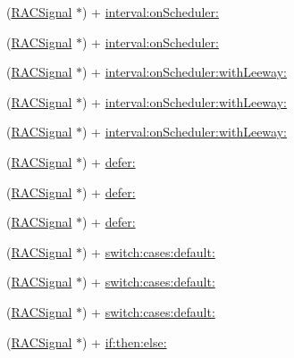 \begin{DoxyCompactItemize}
(\mbox{\hyperlink{interface_r_a_c_signal}{R\+A\+C\+Signal}} $\ast$) + \mbox{\hyperlink{interface_r_a_c_signal_a65442f423ebf08b9217f7bb206780a45}{interval\+:on\+Scheduler\+:}}
\item 
(\mbox{\hyperlink{interface_r_a_c_signal}{R\+A\+C\+Signal}} $\ast$) + \mbox{\hyperlink{interface_r_a_c_signal_a65442f423ebf08b9217f7bb206780a45}{interval\+:on\+Scheduler\+:}}
\item 
(\mbox{\hyperlink{interface_r_a_c_signal}{R\+A\+C\+Signal}} $\ast$) + \mbox{\hyperlink{interface_r_a_c_signal_acd968c129ec1afe3b5bc77db5fc13291}{interval\+:on\+Scheduler\+:with\+Leeway\+:}}
\item 
(\mbox{\hyperlink{interface_r_a_c_signal}{R\+A\+C\+Signal}} $\ast$) + \mbox{\hyperlink{interface_r_a_c_signal_acd968c129ec1afe3b5bc77db5fc13291}{interval\+:on\+Scheduler\+:with\+Leeway\+:}}
\item 
(\mbox{\hyperlink{interface_r_a_c_signal}{R\+A\+C\+Signal}} $\ast$) + \mbox{\hyperlink{interface_r_a_c_signal_acd968c129ec1afe3b5bc77db5fc13291}{interval\+:on\+Scheduler\+:with\+Leeway\+:}}
\item 
(\mbox{\hyperlink{interface_r_a_c_signal}{R\+A\+C\+Signal}} $\ast$) + \mbox{\hyperlink{interface_r_a_c_signal_a3f29638c9c7f60928b7a6cbf2fe25d6f}{defer\+:}}
\item 
(\mbox{\hyperlink{interface_r_a_c_signal}{R\+A\+C\+Signal}} $\ast$) + \mbox{\hyperlink{interface_r_a_c_signal_a3f29638c9c7f60928b7a6cbf2fe25d6f}{defer\+:}}
\item 
(\mbox{\hyperlink{interface_r_a_c_signal}{R\+A\+C\+Signal}} $\ast$) + \mbox{\hyperlink{interface_r_a_c_signal_a3f29638c9c7f60928b7a6cbf2fe25d6f}{defer\+:}}
\item 
(\mbox{\hyperlink{interface_r_a_c_signal}{R\+A\+C\+Signal}} $\ast$) + \mbox{\hyperlink{interface_r_a_c_signal_aac7816b22cfdcbe65cd43d99836ba1f5}{switch\+:cases\+:default\+:}}
\item 
(\mbox{\hyperlink{interface_r_a_c_signal}{R\+A\+C\+Signal}} $\ast$) + \mbox{\hyperlink{interface_r_a_c_signal_aac7816b22cfdcbe65cd43d99836ba1f5}{switch\+:cases\+:default\+:}}
\item 
(\mbox{\hyperlink{interface_r_a_c_signal}{R\+A\+C\+Signal}} $\ast$) + \mbox{\hyperlink{interface_r_a_c_signal_aac7816b22cfdcbe65cd43d99836ba1f5}{switch\+:cases\+:default\+:}}
\item 
(\mbox{\hyperlink{interface_r_a_c_signal}{R\+A\+C\+Signal}} $\ast$) + \mbox{\hyperlink{interface_r_a_c_signal_a67c14dfcf505999bc53632e336f6cb84}{if\+:then\+:else\+:}}
\item 

\end{DoxyCompactItemize}
